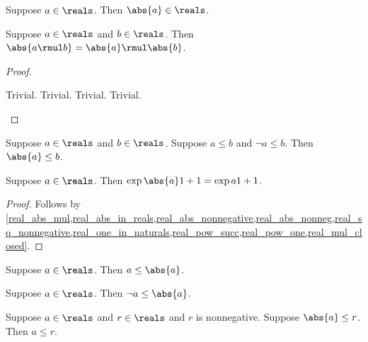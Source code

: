 \begin{lemma}\label{real_abs_in_reals}
    Suppose $a\in\reals$.
    Then $\abs{a}\in\reals$.
\end{lemma}

\begin{proposition}\label{real_abs_mul}
    Suppose $a\in\reals$ and $b\in\reals$.
    Then $\abs{a \rmul b} = \abs{a} \rmul \abs{b}$.
\end{proposition}
\begin{proof}
    \begin{byCase}
        Trivial.
        Trivial.
        Trivial.
        Trivial.
    \end{byCase}
\end{proof}

\begin{proposition}\label{real_abs_leq_if_pm_leq}
    Suppose $a\in\reals$ and $b\in\reals$.
    Suppose $a \leq b$ and $\neg{a} \leq b$.
    Then $\abs{a} \leq b$.
\end{proposition}

\begin{proposition}\label{real_abs_square}
    Suppose $a\in\reals$.
    Then $\exp{\abs{a}}{1+1} = \exp{a}{1+1}$.
\end{proposition}
\begin{proof}
    Follows by \cref{real_abs_mul,real_abs_in_reals,real_abs_nonnegative,real_abs_nonneg,real_sq_nonnegative,real_one_in_naturals,real_pow_succ,real_pow_one,real_mul_closed}.
\end{proof}

\begin{proposition}\label{real_leq_abs}
    Suppose $a\in\reals$.
    Then $a \leq \abs{a}$.
\end{proposition}

\begin{proposition}\label{real_neg_leq_abs}
    Suppose $a\in\reals$.
    Then $\neg{a} \leq \abs{a}$.
\end{proposition}

\begin{proposition}\label{real_abs_leq_imp_right_bound}
    Suppose $a\in\reals$ and $r\in\reals$ and $r$ is nonnegative.
    Suppose $\abs{a} \leq r$.
    Then $a \leq r$.
\end{proposition}

